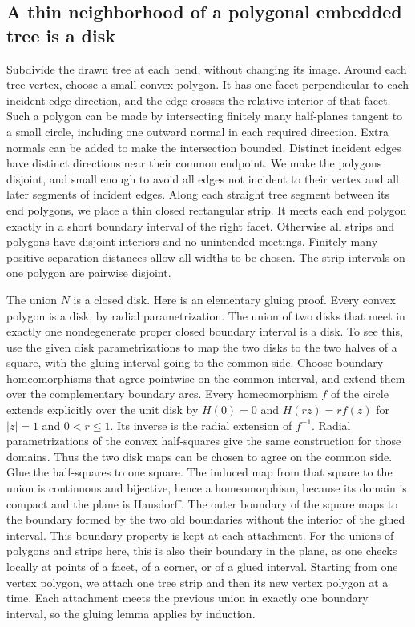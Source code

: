\documentclass[11pt]{article}
\begin{document}
\subsection{A thin neighborhood of a polygonal embedded tree is a disk}

Subdivide the drawn tree at each bend, without changing its image. Around each
tree vertex, choose a small convex polygon. It has one facet perpendicular to
each incident edge direction, and the edge crosses the relative interior of
that facet. Such a polygon can be made by intersecting finitely many
half-planes tangent to a small circle, including one outward normal in each
required direction. Extra normals can be added to make the intersection
bounded. Distinct incident edges have distinct directions near their common
endpoint. We make the polygons disjoint, and small enough to avoid all edges
not incident to their vertex and all later segments of incident edges. Along
each straight tree segment between its end polygons, we place a thin closed
rectangular strip. It meets each end polygon exactly in a short boundary
interval of the right facet. Otherwise all strips and polygons have disjoint
interiors and no unintended meetings. Finitely many positive separation
distances allow all widths to be chosen. The strip intervals on one polygon
are pairwise disjoint.

The union $N$ is a closed disk. Here is an elementary gluing proof. Every
convex polygon is a disk, by radial parametrization. The union of two disks
that meet in exactly one nondegenerate proper closed boundary interval is a
disk. To see this, use the given disk parametrizations to map the two disks to
the two halves of a square, with the gluing interval going to the common side.
Choose boundary homeomorphisms that agree pointwise on the common interval, and
extend them over the complementary boundary arcs. Every homeomorphism $f$ of
the circle extends explicitly over the unit disk by $H(0)=0$ and $H(rz)=rf(z)$
for $|z|=1$ and $0<r\le1$. Its inverse is the radial extension of $f^{-1}$.
Radial parametrizations of the convex half-squares give the same construction
for those domains. Thus the two disk maps can be chosen to agree on the common
side. Glue the half-squares to one square. The induced map from that square to
the union is continuous and bijective, hence a homeomorphism, because its
domain is compact and the plane is Hausdorff. The outer boundary of the square
maps to the boundary formed by the two old boundaries without the interior of
the glued interval. This boundary property is kept at each attachment. For the
unions of polygons and strips here, this is also their boundary in the plane,
as one checks locally at points of a facet, of a corner, or of a glued
interval. Starting from one vertex polygon, we attach one tree strip and then
its new vertex polygon at a time. Each attachment meets the previous union in
exactly one boundary interval, so the gluing lemma applies by induction.
\end{document}
